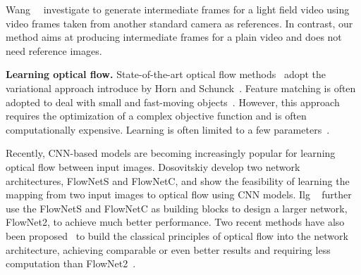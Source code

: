 \documentclass[10pt,twocolumn,letterpaper]{article}
\begin{document}
Wang~\etal~\cite{wang17light} investigate to generate intermediate frames for a light field video using video frames taken from another standard camera as references. In contrast, our method aims at producing intermediate frames for a plain video and does not need reference images.
 





\noindent\textbf{Learning optical flow.} 
State-of-the-art optical flow methods~\cite{Wulff2017Optical,Xu2017Accurate} adopt the variational approach introduce by Horn and Schunck~\cite{Horn:1981:DO}. Feature matching is often adopted to deal with small and fast-moving objects~\cite{Brox:LDOF:2011,EpicFlow}.  However, this approach requires the optimization of a complex objective function and is often computationally expensive. Learning is often limited to a few parameters~\cite{Li2008Learning,Roth:2007:SSO,Sun:2008:LOF}.

Recently, CNN-based models are becoming increasingly popular for learning optical flow between input images.
Dosovitskiy \etal\cite{Dosovitskiy:2015Flownet} develop two network architectures, FlowNetS and FlowNetC, and show the feasibility of learning the mapping from two input images to optical flow using CNN models. Ilg \etal~\cite{ilg16flownet2} further use the FlowNetS and FlowNetC as building blocks to design a larger network, FlowNet2,  to achieve much better performance. Two recent methods have also been proposed~\cite{Ranjan:2016:SpyNet,sun2017pwc} to build the classical principles of optical flow into the network architecture, achieving comparable or even better results and requiring less computation than FlowNet2~\cite{ilg16flownet2}.  
\end{document}
